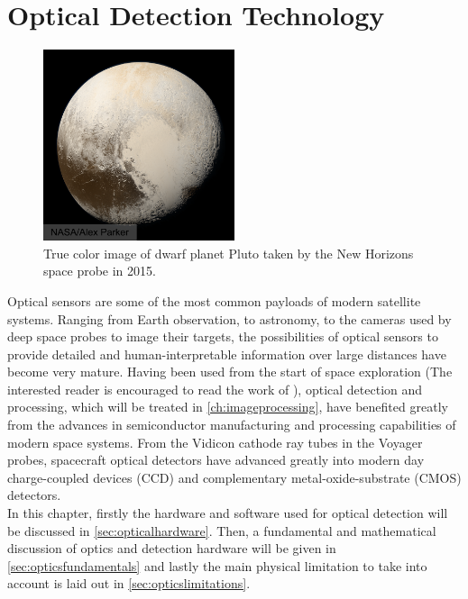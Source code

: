 \chapter{Optical Detection Technology}
\label{ch:optical}

\begin{figure}[htbp]
    \centering
    \includegraphics[width=0.5\textwidth]{images/pluto.png}
    \caption{True color image of dwarf planet Pluto taken by the New Horizons space probe in 2015. }
    \label{fig:pluto}
\end{figure}

Optical sensors are some of the most common payloads of modern satellite systems. Ranging from Earth observation, to astronomy, to the cameras used by deep space probes to image their targets, the possibilities of optical sensors to provide detailed and human-interpretable information over large distances have become very mature. Having been used from the start of space exploration (The interested reader is encouraged to read the work of \cite{evolutionofcamera}), optical detection and processing, which will be treated in \autoref{ch:imageprocessing}, have benefited greatly from the advances in semiconductor manufacturing and processing capabilities of modern space systems. From the Vidicon cathode ray tubes in the Voyager probes, spacecraft optical detectors have advanced greatly into modern day charge-coupled devices (CCD) and complementary metal-oxide-substrate (CMOS) detectors.\\

In this chapter, firstly the hardware and software used for optical detection will be discussed in \autoref{sec:opticalhardware}. Then, a fundamental and mathematical discussion of optics and detection hardware will be given in \autoref{sec:opticsfundamentals} and lastly the main physical limitation to take into account is laid out in \autoref{sec:opticslimitations}.

